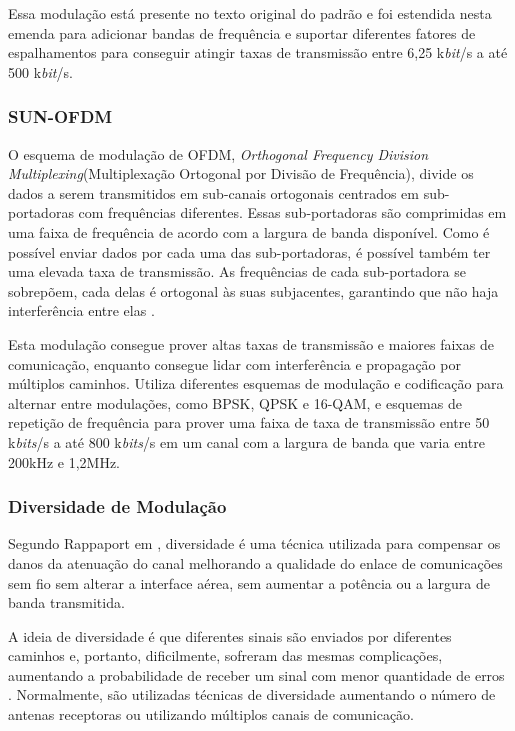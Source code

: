 Essa modulação está presente no texto original do padrão e foi estendida nesta emenda para adicionar bandas de frequência e suportar diferentes fatores de espalhamentos para conseguir atingir taxas de transmissão entre 6,25 k\emph{bit}/s a até 500 k\emph{bit}/s.

\subsubsection*{SUN-OFDM}
O esquema de modulação de OFDM, \emph{Orthogonal Frequency Division Multiplexing}(Multiplexação Ortogonal por Divisão de Frequência), divide os dados a serem transmitidos em sub-canais ortogonais centrados em  sub-portadoras com frequências diferentes. Essas sub-portadoras são comprimidas em uma faixa de frequência de acordo com a largura de banda disponível. Como é possível enviar dados por cada uma das sub-portadoras, é possível também ter uma elevada taxa de transmissão. As frequências de cada sub-portadora se sobrepõem, cada delas é ortogonal às suas subjacentes, garantindo que não haja interferência entre elas \cite{rappaport2009}\cite{goldsmith2005wireless}.

Esta modulação consegue prover altas taxas de transmissão e maiores faixas de comunicação, enquanto consegue lidar com interferência e propagação por múltiplos caminhos. Utiliza diferentes esquemas de modulação e codificação para alternar entre modulações, como BPSK, QPSK e 16-QAM, e esquemas de repetição de frequência para prover uma faixa de taxa de transmissão entre 50 k\emph{bits}/s a até 800 k\emph{bits}/s em um canal com a largura de banda que varia entre 200kHz e 1,2MHz.

\subsubsection*{Diversidade de Modulação}
Segundo Rappaport em \cite{rappaport2009}, diversidade é uma técnica utilizada para compensar os danos da atenuação do canal melhorando a qualidade do enlace de comunicações sem fio sem alterar a interface aérea, sem aumentar a potência ou a largura de banda transmitida.

A ideia de diversidade é que diferentes sinais são enviados por diferentes caminhos e, portanto, dificilmente, sofreram das mesmas complicações, aumentando a probabilidade de receber um sinal com menor quantidade de erros \cite{goldsmith2005wireless}. Normalmente, são utilizadas técnicas de diversidade aumentando o número de antenas receptoras ou utilizando múltiplos canais de comunicação.

